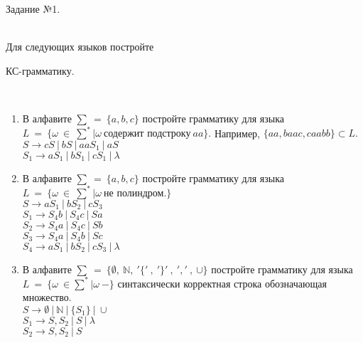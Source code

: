 \documentclass{article}
\begin{document}
    \huge{\centerline{Задание №1.} \\Для следующих языков постройте \\ \centerline{КС-грамматику.}\\}
        \begin{enumerate}
        
        \LARGE
        \item   В алфавите \(\sum\ =\ \{a,b,c\}\) постройте грамматику для языка \(L\ =\ \{\omega\ \in \ \sum^*|\omega\ \text{содержит подстроку} \ aa\}.\) Например, \( \{aa, baac, caabb\} \subset L.\)\\
        
        \hspace*{-20mm} \(S\rightarrow cS\ | \ bS \ | \ aaS_1 \ | \ aS\)\\
        \hspace*{-20mm} \(S_1\rightarrow aS_1 \ | \ bS_1 \ | \ cS_1 \ | \ \lambda\)\\
        
        \item В алфавите \(\sum\ =\ \{a,b,c\}\) постройте грамматику для языка \(L\ =\ \{\omega\ \in \ \sum^*|\omega\ \text{не полиндром}.\}\) \\
        
        \hspace*{-20mm}\(S\rightarrow aS_1\ | \ bS_2 \ | \ cS_3 \)\\
		\hspace*{-20mm}\(S_1\rightarrow S_4b \ | \ S_4c \ | \ Sa \)\\
		\hspace*{-20mm}\(S_2\rightarrow S_4a \ | \ S_4c \ | \ Sb \)\\
		\hspace*{-20mm}\(S_3\rightarrow S_4a \ | \ S_4b \ | \ Sc \)\\
		\hspace*{-20mm}\(S_4\rightarrow aS_1\ | \ bS_2 \ | \ cS_3 \ | \ \lambda\)\\
		
		\item В алфавите \(\sum\ =\ \{\emptyset,\ \mathbb{N},\ '\{'\ ,\ '\}'\ ,\ ','\ ,\ \cup\}\) постройте грамматику для языка \\ \(L\ =\ \{\omega\ \in \sum^*|\omega\ - \}\) синтаксически корректная строка обозначающая множество.\\
        
        \hspace*{-20mm}\(S\rightarrow \emptyset\ | \ \mathbb{N} \ | \ \{S_1\} \ | \  \cup\)\\
		\hspace*{-20mm}\(S_1\rightarrow S,S_2 \ | \ S \ | \ \lambda \)\\
		\hspace*{-20mm}\(S_2\rightarrow S,S_2 \ | \ S\)\\
		
        \end{enumerate}
        
\end{document}
